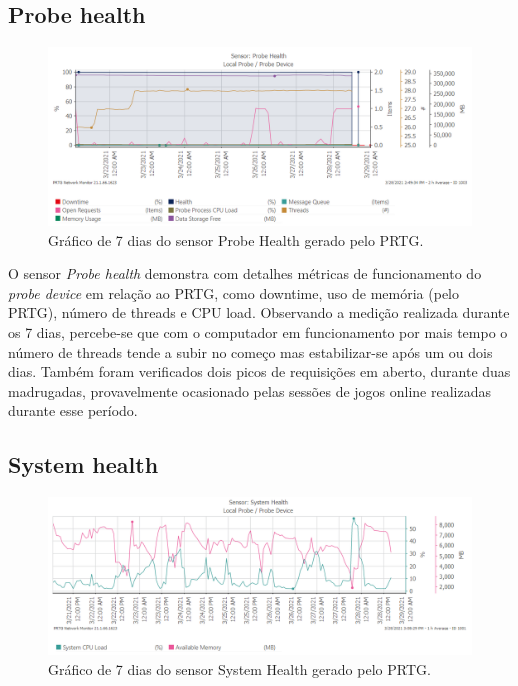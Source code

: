 \documentclass[12pt]{article}
\begin{document}
\subsection{Probe health}

\begin{figure}[H]
    \includegraphics[width=\linewidth]{probe_health.png}
    \caption{Gráfico de 7 dias do sensor Probe Health gerado pelo PRTG.}
\end{figure}

O sensor \emph{Probe health} demonstra com detalhes métricas de funcionamento do \emph{probe device} em relação ao PRTG, como downtime, uso de memória (pelo PRTG), número de threads e CPU load. Observando a medição realizada durante os 7 dias, percebe-se que com o computador em funcionamento por mais tempo o número de threads tende a subir no começo mas estabilizar-se após um ou dois dias. Também foram verificados dois picos de requisições em aberto, durante duas madrugadas, provavelmente ocasionado pelas sessões de jogos online realizadas durante esse período.

\subsection{System health}

\begin{figure}[H]
    \includegraphics[width=\linewidth]{system_health.png}
    \caption{Gráfico de 7 dias do sensor System Health gerado pelo PRTG.}
\end{figure}
\end{document}
